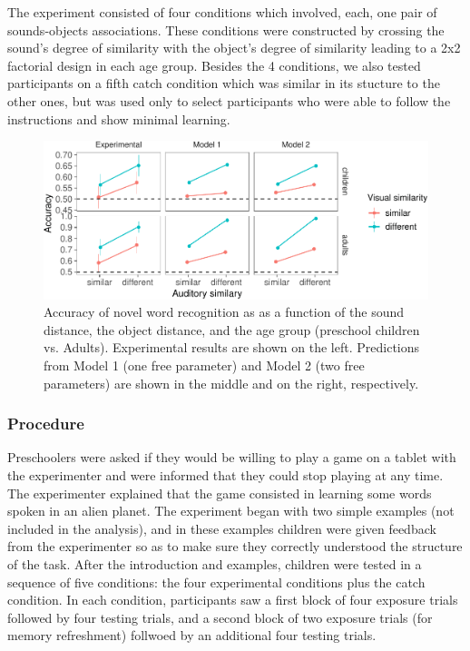 \documentclass[10pt, letterpaper]{article}
\newenvironment{CodeChunk}{}{}
\begin{document}
The experiment consisted of four conditions which involved, each, one
pair of sounds-objects associations. These conditions were constructed
by crossing the sound's degree of similarity with the object's degree of
similarity leading to a 2x2 factorial design in each age group. Besides
the 4 conditions, we also tested participants on a fifth catch condition
which was similar in its stucture to the other ones, but was used only
to select participants who were able to follow the instructions and show
minimal learning.

\begin{CodeChunk}
\begin{figure}[h]

{\centering \includegraphics{figs/all_data-1} 

}

\caption{\label{fig:data_all}Accuracy of novel word recognition as as a function of the sound distance, the object distance, and the age group (preschool children vs. Adults). Experimental results are shown on the left. Predictions from Model 1 (one free parameter) and Model 2 (two free parameters) are shown in the middle and on the right, respectively.}\label{fig:all_data}
\end{figure}
\end{CodeChunk}

\subsubsection{Procedure}\label{procedure}

Preschoolers were asked if they would be willing to play a game on a
tablet with the experimenter and were informed that they could stop
playing at any time. The experimenter explained that the game consisted
in learning some words spoken in an alien planet. The experiment began
with two simple examples (not included in the analysis), and in these
examples children were given feedback from the experimenter so as to
make sure they correctly understood the structure of the task. After the
introduction and examples, children were tested in a sequence of five
conditions: the four experimental conditions plus the catch condition.
In each condition, participants saw a first block of four exposure
trials followed by four testing trials, and a second block of two
exposure trials (for memory refreshment) follwoed by an additional four
testing trials.
\end{document}
